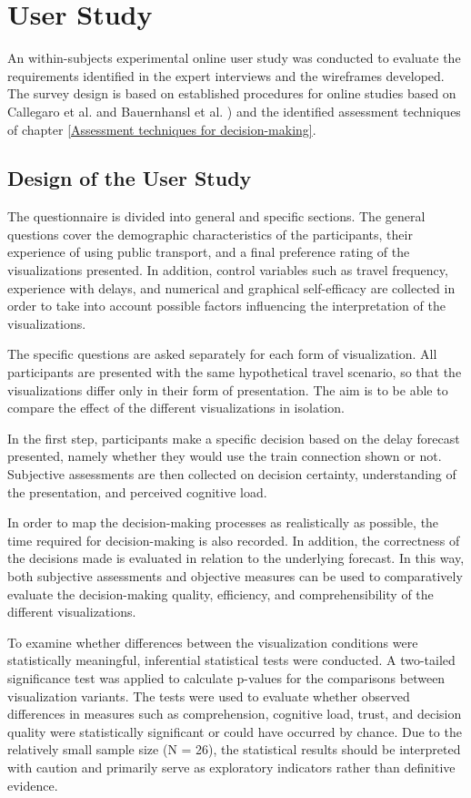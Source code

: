 \documentclass[final,journal,a4paper]{IEEEtran}
\begin{document}
\section{User Study} \label{User Study}
An within-subjects experimental online user study was conducted to evaluate the requirements identified in the expert interviews and the wireframes developed. The survey design is based on established procedures for online studies based on Callegaro et al. \cite{Callegaro2015} and Bauernhansl et al. \cite{Bauernhansl2025}) and the identified assessment techniques of chapter \ref{Assessment techniques for decision-making}.

\subsection{Design of the User Study}
The questionnaire is divided into general and specific sections. The general questions cover the demographic characteristics of the participants, their experience of using public transport, and a final preference rating of the visualizations presented. In addition, control variables such as travel frequency, experience with delays, and numerical and graphical self-efficacy are collected in order to take into account possible factors influencing the interpretation of the visualizations.

The specific questions are asked separately for each form of visualization. All participants are presented with the same hypothetical travel scenario, so that the visualizations differ only in their form of presentation. The aim is to be able to compare the effect of the different visualizations in isolation. 

In the first step, participants make a specific decision based on the delay forecast presented, namely whether they would use the train connection shown or not. Subjective assessments are then collected on decision certainty, understanding of the presentation, and perceived cognitive load.

In order to map the decision-making processes as realistically as possible, the time required for decision-making is also recorded. In addition, the correctness of the decisions made is evaluated in relation to the underlying forecast. In this way, both subjective assessments and objective measures can be used to comparatively evaluate the decision-making quality, efficiency, and comprehensibility of the different visualizations.

To examine whether differences between the visualization conditions were statistically meaningful, inferential statistical tests were conducted. A two-tailed significance test was applied to calculate p-values for the comparisons between visualization variants. The tests were used to evaluate whether observed differences in measures such as comprehension, cognitive load, trust, and decision quality were statistically significant or could have occurred by chance. Due to the relatively small sample size (N = 26), the statistical results should be interpreted with caution and primarily serve as exploratory indicators rather than definitive evidence.
\end{document}
